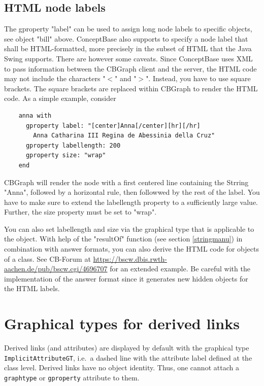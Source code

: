 \subsection{HTML node labels}
\label{htmllabels}

The gproperty "label" can be used to assign long node labels to specific objects, see object "bill" above.
ConceptBase also supports to specify a node label that shall be HTML-formatted, more precisely in the subset
of HTML that the Java Swing supports. There are however some caveats. Since ConceptBase uses XML to
pass information between the CBGraph client and the server, the HTML code may not include the characters "$<$" and
"$>$". Instead, you have to use square brackets. The square brackets are replaced within CBGraph to render the
HTML code. As a simple example, consider

{\small
\begin{verbatim}
    anna with  
      gproperty label: "[center]Anna[/center][hr][/hr]
        Anna Catharina III Regina de Abessinia della Cruz"
      gproperty labellength: 200
      gproperty size: "wrap"
    end
\end{verbatim}
}

CBGraph will render the node with a first centered line containing the Strring "Anna", followed by a horizontal rule, then
followwed by the rest of the label. You have to make sure to extend the labellength property to a sufficiently large value.
Further, the size property must be set to "wrap".

You can also set labellength and size via the graphical type that is applicable to the object. With help
of the "resultOf" function (see section \ref{stringmanu}) in combination with answer formats, you can also derive
the HTML code for objects of a class. See
CB-Forum at
\url{https://bscw.dbis.rwth-aachen.de/pub/bscw.cgi/4696707}
for an extended example. Be careful with the implementation of the answer format since it generates new hidden objects
for the HTML labels. 





\section{Graphical types for derived links}
\label{gtypederived}

Derived links (and attributes) are displayed by default with the graphical type 
{\tt ImplicitAttributeGT}, i.e.\ a dashed line with the attribute label defined
at the class level. Derived links have no object identity. Thus, one cannot attach
a {\tt graphtype} or {\tt gproperty} attribute to them. 

